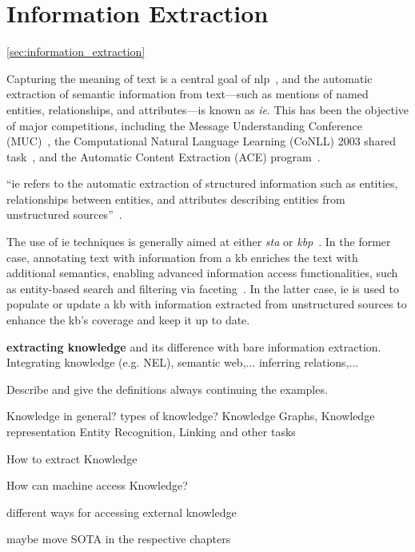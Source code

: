 \section{Information Extraction}
\ref{sec:information_extraction}

Capturing the meaning of text is a central goal of \acl{nlp}~\cite{entityorientedsearch2018}, and the automatic extraction of semantic information from text---such as mentions of named entities, relationships, and attributes---is known as \emph{\acl{ie}}. This has been the objective of major competitions, including the Message Understanding Conference (MUC)~\cite{muc_lessons_1998,muc6_overview_1995,muc7_overview_1998}, the Computational Natural Language Learning (CoNLL) 2003 shared task~\cite{conll2003}, and the Automatic Content Extraction (ACE) program~\cite{ace_2004}.

\begin{definition}
``\Acf{ie} refers to the automatic extraction of structured information such as entities, relationships between entities, and attributes describing entities from unstructured sources''~\cite{infoextraction2008}.
\end{definition}
The use of \ac{ie} techniques is generally aimed at either \emph{\acl{sta}} or \emph{\acl{kbp}}~\cite{entityorientedsearch2018}.
In the former case, annotating text with information from a \ac{kb} enriches the text with additional semantics, enabling advanced information access functionalities, such as entity-based search and filtering via faceting~\cite{entityorientedsearch2018}.
In the latter case, \ac{ie} is used to populate or update a \ac{kb} with information extracted from unstructured sources to enhance the \ac{kb}'s coverage and keep it up to date.




\textbf{extracting knowledge} and its difference with bare information extraction. Integrating knowledge (e.g. NEL), semantic web,... inferring relations,...

Describe and give the definitions always continuing the examples.

Knowledge in general? types of knowledge? Knowledge Graphs, Knowledge representation
Entity Recognition, Linking and other tasks

How to extract Knowledge

How can machine access Knowledge?

different ways for accessing external knowledge

maybe move SOTA in the respective chapters
